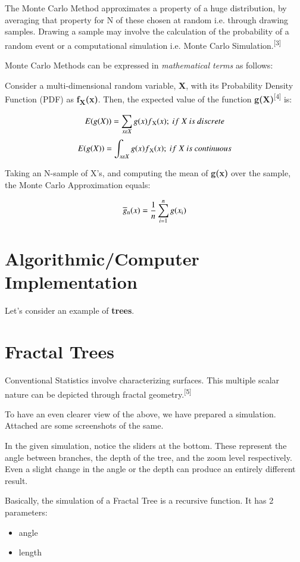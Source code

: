 \documentclass{resonance}
\begin{document}
	The Monte Carlo Method approximates a property of a huge distribution, by averaging that property for N of these chosen at random i.e. through drawing samples. Drawing a sample may involve the calculation of the probability of a random event or a computational simulation i.e. Monte Carlo Simulation.\textsuperscript{[3]}
	
	Monte Carlo Methods can be expressed in \textit{mathematical terms} as follows:
	
	Consider a multi-dimensional random variable, \textbf{X}, with its Probability Density Function (PDF) as \textbf{f\textsubscript{X}(x)}. Then, the expected value of the function \textbf{g(X)}\textsuperscript{[4]} is:
	
	$$E(g(X)) = \sum_{x\varepsilon X} g(x)f\textsubscript{X}(x);\ if\ X\ is\ discrete$$
	$$E(g(X)) = \int_{x\varepsilon X} g(x)f\textsubscript{X}(x);\ if\ X\ is\ continuous$$
	
	Taking an N-sample of X’s, and computing the mean of \textbf{g(x)} over the sample, the Monte Carlo Approximation equals:
	
	$$ \overline{g}\textsubscript{n}(x) = \frac{1}{n} \sum_{i=1}^{n}g(x\textsubscript{i}) $$
	
	\section*{Algorithmic/Computer Implementation}
	Let's consider an example of \textbf{trees}.
	
	
	\setlength{\leftskip}{0cm}
	\section{Fractal Trees}
	
	Conventional Statistics involve characterizing surfaces. This multiple scalar nature can be depicted through fractal geometry.\textsuperscript{[5]}
	
	To have an even clearer view of the above, we have prepared a simulation. Attached are some screenshots of the same.
	
	In the given simulation, notice the sliders at the bottom. These represent the angle between branches, the depth of the tree, and the zoom level respectively. Even a slight change in the angle or the depth can produce an entirely different result.
	
	Basically, the simulation of a Fractal Tree is a recursive function. It has 2 parameters:
	\begin{itemize}
		\item angle
		\item length
	\end{itemize}
	
\end{document}
